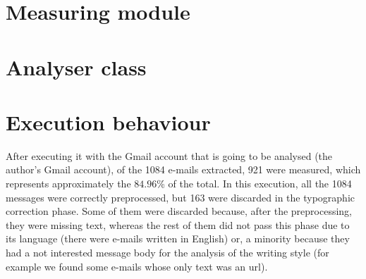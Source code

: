 \section{Measuring module} \label{section:measmod}


\section{Analyser class}\label{sect:analyserclass}


\section{Execution behaviour} \label{section:exebehav}
After executing it with the Gmail account that is going to be analysed (the author's Gmail account), of the 1084 e-mails extracted, 921 were measured, which represents approximately the $84.96$\% of the total. In this execution, all the 1084 messages were correctly preprocessed, but 163 were discarded in the typographic correction phase. Some of them were discarded because, after the preprocessing, they were missing text, whereas the rest of them did not pass this phase due to its language (there were e-mails written in English) or, a minority because they had a not interested message body for the analysis of the writing style (for example we found some e-mails whose only text was an url).